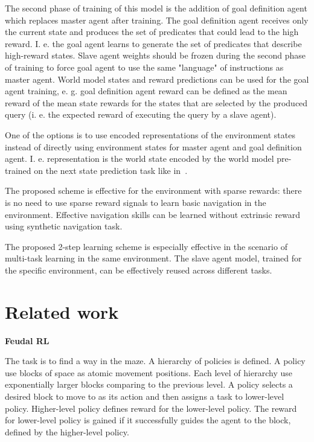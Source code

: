 \documentclass{article}
\begin{document}
The second phase of training of this model is the addition of goal definition agent which replaces master agent after training. The goal definition agent receives only the current state and produces the set of predicates that could lead to the high reward. I. e. the goal agent learns to generate the set of predicates that describe high-reward states. Slave agent weights should be frozen during the second phase of training to force goal agent to use the same "language" of instructions as master agent. World model states and reward predictions can be used for the goal agent training, e. g. goal definition agent reward can be defined as the mean reward of the mean state rewards for the states that are selected by the produced query (i. e. the expected reward of executing the query by a slave agent).

One of the options is to use encoded representations of the environment states instead of directly using environment states for master agent and goal definition agent. I. e. representation is the world state encoded by the world model pre-trained on the next state prediction task like in~\citep{Ha2018RecurrentWM}.

The proposed scheme is effective for the environment with sparse rewards: there is no need to use sparse reward signals to learn basic navigation in the environment. Effective navigation skills can be learned without extrinsic reward using synthetic navigation task.

The proposed 2-step learning scheme is especially effective in the scenario of multi-task learning in the same environment. The slave agent model, trained for the specific environment, can be effectively reused across different tasks.

\section{Related work}

\textbf{Feudal RL}~\citep{Dayan1992FeudalRL}

The task is to find a way in the maze. A hierarchy of policies is defined. A policy use blocks of space as atomic movement positions. Each level of hierarchy use exponentially larger blocks comparing to the previous level. A policy selects a desired block to move to as its action and then assigns a task to lower-level policy. Higher-level policy defines reward for the lower-level policy. The reward for lower-level policy is gained if it successfully guides the agent to the block, defined by the higher-level policy.
\end{document}
